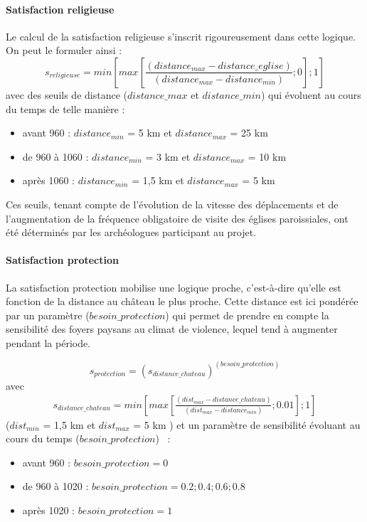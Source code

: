 \paragraph{Satisfaction religieuse}
		
Le calcul de la satisfaction religieuse s'inscrit rigoureusement dans cette logique.
On peut le formuler ainsi :
		\begin{equation*}
		s_{religieuse} = min \left \lbrack max \left \lbrack \frac{(distance_{max} - distance\_eglise)}{(distance_{max} -distance_{min})}; 0 \right \rbrack ; 1 \right \rbrack
		\end{equation*}
avec des seuils de distance ($distance\_max$ et $distance\_min$) qui évoluent au cours du temps de telle manière :
\begin{itemize}
	\item avant 960 : $distance_{min}$ = 5 km et $distance_{max}$ = 25 km
	\item de 960 à 1060 : $distance_{min}$ = 3 km et $distance_{max}$ = 10 km
	\item après 1060 : $distance_{min}$ = 1,5 km et $distance_{max}$ = 5 km
\end{itemize}
Ces seuils, tenant compte de l'évolution de la vitesse des déplacements et de l'augmentation de la fréquence obligatoire de visite des églises paroissiales, ont été déterminés par les archéologues participant au projet.

	
\paragraph{Satisfaction \og protection\fg{}}	

La satisfaction \og protection\fg{} mobilise une logique proche, c'est-à-dire qu'elle est fonction de la distance au château le plus proche.
Cette distance est ici pondérée par un paramètre ($besoin\_protection$) qui permet de prendre en compte la sensibilité des foyers paysans au climat de violence, lequel tend à augmenter pendant la période.

\begin{equation*}
s_{protection} = (s_{distance\_chateau})^{(besoin\_protection)}
\end{equation*}
avec
\begin{equation*}
\begin{gathered}
s_{distance\_chateau} = min \left \lbrack
max \left \lbrack \frac{(dist_{max} - distance\_chateau)}{(dist_{max} -distance_{min})}; 0.01 \right \rbrack ; 1 \right \rbrack
\end{gathered}
\end{equation*}
($dist_{min}$ = 1,5 km et $dist_{max}$ = 5 km )
et un paramètre de sensibilité évoluant au cours du temps ($besoin\_protection$)  :
\begin{itemize}
	\item avant 960 : $besoin\_protection = 0 $
	\item de 960 à 1020 : $besoin\_protection = 0.2 ; 0.4 ; 0.6 ; 0.8$
	\item après 1020 : $besoin\_protection = 1$
\end{itemize}

